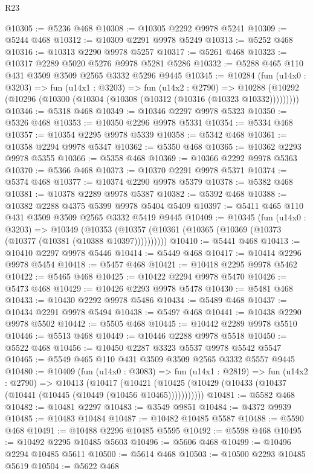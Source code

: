 \begin{lexlean}{R23}
\begin{coremodule}
@10305 := @5236 @468
@10308 := @10305 @2292 @9978 @5241
@10309 := @5244 @468
@10312 := @10309 @2291 @9978 @5249
@10313 := @5252 @468
@10316 := @10313 @2290 @9978 @5257
@10317 := @5261 @468
@10323 := @10317 @2289 @5020 @5276 @9978 @5281 @5286
@10332 := @5288 @465 @110 @431 @3509 @3509 @2565 @3332 @5296 @9445
@10345 := @10284
    (fun (u14x0 : @3203) =>
    fun (u14x1 : @3203) =>
    fun (u14x2 : @2790) =>
    @10288 (@10292 (@10296 (@10300 (@10304 (@10308 (@10312 (@10316 (@10323 @10332)))))))))
@10346 := @5318 @468
@10349 := @10346 @2297 @9978 @5323
@10350 := @5326 @468
@10353 := @10350 @2296 @9978 @5331
@10354 := @5334 @468
@10357 := @10354 @2295 @9978 @5339
@10358 := @5342 @468
@10361 := @10358 @2294 @9978 @5347
@10362 := @5350 @468
@10365 := @10362 @2293 @9978 @5355
@10366 := @5358 @468
@10369 := @10366 @2292 @9978 @5363
@10370 := @5366 @468
@10373 := @10370 @2291 @9978 @5371
@10374 := @5374 @468
@10377 := @10374 @2290 @9978 @5379
@10378 := @5382 @468
@10381 := @10378 @2289 @9978 @5387
@10382 := @5392 @468
@10388 := @10382 @2288 @4375 @5399 @9978 @5404 @5409
@10397 := @5411 @465 @110 @431 @3509 @3509 @2565 @3332 @5419 @9445
@10409 := @10345
    (fun (u14x0 : @3203) =>
    @10349 (@10353 (@10357 (@10361 (@10365 (@10369 (@10373 (@10377 (@10381 (@10388 @10397))))))))))
@10410 := @5441 @468
@10413 := @10410 @2297 @9978 @5446
@10414 := @5449 @468
@10417 := @10414 @2296 @9978 @5454
@10418 := @5457 @468
@10421 := @10418 @2295 @9978 @5462
@10422 := @5465 @468
@10425 := @10422 @2294 @9978 @5470
@10426 := @5473 @468
@10429 := @10426 @2293 @9978 @5478
@10430 := @5481 @468
@10433 := @10430 @2292 @9978 @5486
@10434 := @5489 @468
@10437 := @10434 @2291 @9978 @5494
@10438 := @5497 @468
@10441 := @10438 @2290 @9978 @5502
@10442 := @5505 @468
@10445 := @10442 @2289 @9978 @5510
@10446 := @5513 @468
@10449 := @10446 @2288 @9978 @5518
@10450 := @5522 @468
@10456 := @10450 @2287 @3323 @5537 @9978 @5542 @5547
@10465 := @5549 @465 @110 @431 @3509 @3509 @2565 @3332 @5557 @9445
@10480 := @10409
    (fun (u14x0 : @3083) =>
    fun (u14x1 : @2819) =>
    fun (u14x2 : @2790) =>
    @10413
      (@10417
        (@10421 (@10425 (@10429 (@10433 (@10437 (@10441 (@10445 (@10449 (@10456 @10465)))))))))))
@10481 := @5582 @468
@10482 := @10481 @2297
@10483 := @3549 @9851
@10484 := @4372 @9939
@10485 := @10483 @10484
@10487 := @10482 @10485 @5587
@10488 := @5590 @468
@10491 := @10488 @2296 @10485 @5595
@10492 := @5598 @468
@10495 := @10492 @2295 @10485 @5603
@10496 := @5606 @468
@10499 := @10496 @2294 @10485 @5611
@10500 := @5614 @468
@10503 := @10500 @2293 @10485 @5619
@10504 := @5622 @468

\end{coremodule}
\end{lexlean}

